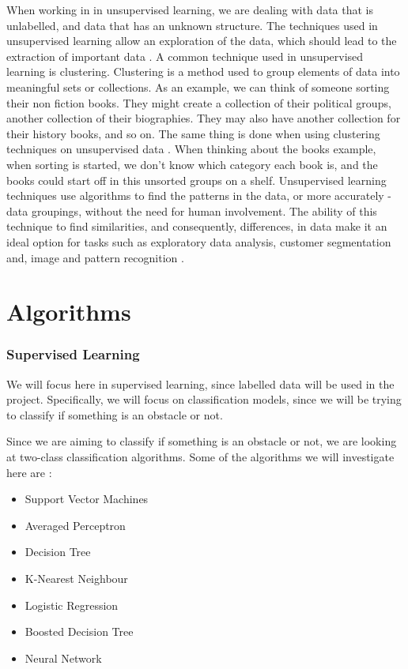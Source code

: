 \documentclass[conference]{IEEEtran}
\begin{document}
When working in in unsupervised learning, we are dealing with data that is unlabelled, and data that has an unknown structure. The techniques used in unsupervised learning allow an exploration of the data, which should lead to the extraction of important data \cite{pythonML}. A common technique used in unsupervised learning is clustering. Clustering is a method used to group elements of data into meaningful sets or collections. As an example, we can think of someone sorting their non fiction books. They might create a collection of their political groups, another collection of their biographies. They may also have another collection for their history books, and so on. The same thing is done when using clustering techniques on unsupervised data \cite{google1}. When thinking about the books example, when sorting is started, we don't know which category each book is, and the books could start off in this unsorted groups on a shelf. Unsupervised learning techniques use algorithms to find the patterns in the data, or more accurately - data groupings, without the need for human involvement. The ability of this technique to find similarities, and consequently, differences, in data make it an ideal option for tasks such as exploratory data analysis, customer segmentation and, image and pattern recognition \cite{ibm_ml}.

\section{Algorithms}
\subsubsection{Supervised Learning}
We will focus here in supervised learning, since labelled data will be used in the project. Specifically, we will focus on classification models, since we will be trying to classify if something is an obstacle or not.

Since we are aiming to classify if something is an obstacle or not, we are looking at two-class classification algorithms. Some of the algorithms we will investigate here are \cite{azure}:



\begin{itemize}
    \item Support Vector Machines
    \item Averaged Perceptron
    \item Decision Tree
    \item K-Nearest Neighbour
    \item Logistic Regression
    \item Boosted Decision Tree
    \item Neural Network
\end{itemize}
\end{document}
